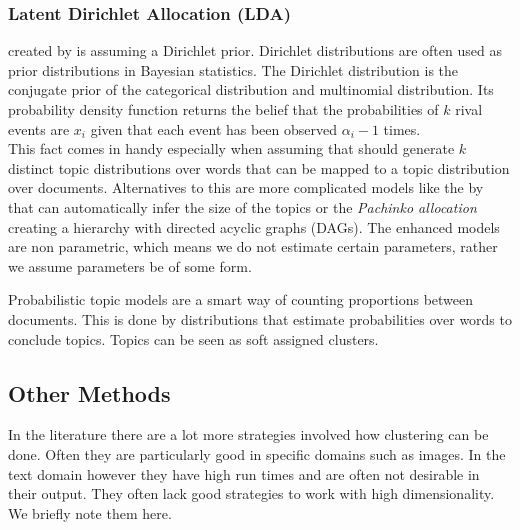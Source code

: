       \subsubsection*{Latent Dirichlet Allocation (LDA)}
      \label{sec:lda}

        \ldalong{} created by \cite{LDA2003} is \plsi{} assuming a Dirichlet prior. Dirichlet distributions are often used as prior distributions in Bayesian statistics. The Dirichlet distribution is the conjugate prior of the categorical distribution and multinomial distribution. Its probability density function returns the belief that the probabilities of $k$ rival events are $x_i$ given that each event has been observed $\alpha_i-1$ times.\\
        This fact comes in handy especially when assuming that \lda{} should generate $k$ distinct topic distributions over words that can be mapped to a topic distribution over documents. \cite{TopicModelsBlei2012}
        Alternatives to this are more complicated models like the \hdpfull{} by \cite{HDP2006} that can automatically infer the size of the topics or the \emph{Pachinko allocation} creating a hierarchy with directed acyclic graphs (DAGs). \cite{NonParametricBayes2007} The enhanced models are non parametric, which means we do not estimate certain parameters, rather we assume parameters be of some form.
        
      Probabilistic topic models are a smart way of counting proportions between documents. This is done by distributions that estimate probabilities over words to conclude topics. Topics can be seen as soft assigned clusters.

    \subsection{Other Methods}
    In the literature there are a lot more strategies involved how clustering can be done. Often they are particularly good in specific domains such as images. In the text domain however they have high run times and are often not desirable in their output. They often lack good strategies to work with high dimensionality. We briefly note them here.

